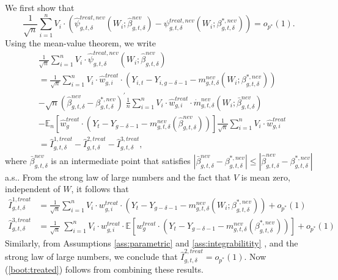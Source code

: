 \documentclass[11pt]{article}%
\theoremstyle{plain}
\numberwithin{sassumption}{section}
\numberwithin{equation}{section}
\begin{document}
{\small We first show that
\begin{equation}
\frac{1}{\sqrt{n}}\sum_{i=1}^{n}V_{i}\cdot\left(  \widehat{\psi}_{g,t,\delta
}^{treat,nev}(W_{i};\widehat{\beta}_{g,t,\delta}^{nev})-\psi_{g,t,\delta
}^{treat,nev}(W_{i};\beta_{g,t,\delta}^{\ast,nev})\right)  =o_{p^{\ast}%
}\left(  1\right)  . \label{boot:treated}%
\end{equation}
Using the mean-value theorem, we write%
\begin{align*}
&  \frac{1}{\sqrt{n}}\sum_{i=1}^{n}V_{i}\cdot\widehat{\psi}_{g,t,\delta
}^{treat,nev}(W_{i};\widehat{\beta}_{g,t,\delta}^{nev})\\
&  =\frac{1}{\sqrt{n}}\sum_{i=1}^{n}V_{i}\cdot\widehat{w}_{g,i}^{treat}%
\cdot\left(  Y_{i,t}-Y_{i,g-\delta-1}-m_{g,t,\delta}^{nev}\left(  W_{i}%
;\beta_{g,t,\delta}^{\ast,nev}\right)  \right) \\
&  -\sqrt{n}\left(  \widehat{\beta}_{g,t,\delta}^{nev}-\beta_{g,t,\delta
}^{\ast,nev}\right)  ^{\prime}\frac{1}{n}\sum_{i=1}^{n}V_{i}\cdot
\widehat{w}_{g,i}^{treat}\cdot\dot{m}_{g,t,\delta}^{nev}\left(  W_{i}%
;\bar{\beta}_{g,t,\delta}^{nev}\right) \\
&  -\mathbb{E}_{n}\left[  \widehat{w}_{g}^{treat}\cdot\left(  Y_{t}%
-Y_{g-\delta-1}-m_{g,t,\delta}^{nev}\left(  \widehat{\beta}_{g,t,\delta}%
^{nev}\right)  \right)  \right]  \frac{1}{\sqrt{n}}\sum_{i=1}^{n}V_{i}%
\cdot\widehat{w}_{g,i}^{treat}\\
&  =\widehat{I}_{g,t,\delta}^{1,treat}-\widehat{I}_{g,t,\delta}^{2,treat}%
-\widehat{I}_{g,t,\delta}^{3,treat},
\end{align*}
where $\bar{\beta}_{g,t,\delta}^{nev}$ is an intermediate point that satisfies
$\left\vert \bar{\beta}_{g,t,\delta}^{nev}-\beta_{g,t,\delta}^{\ast
,nev}\right\vert \leq\left\vert \widehat{\beta}_{g,t,\delta}^{nev}%
-\beta_{g,t,\delta}^{\ast,nev}\right\vert $ a.s.. From the strong law of large
numbers and the fact that $V$ is mean zero, independent of $W$, it follows
that
\begin{align*}
\widehat{I}_{g,t,\delta}^{1,treat}  &  =\frac{1}{\sqrt{n}}\sum_{i=1}^{n}%
V_{i}\cdot w_{g,i}^{treat}\cdot\left(  Y_{t}-Y_{g-\delta-1}-m_{g,t,\delta
}^{nev}\left(  W_{i};\beta_{g,t,\delta}^{\ast,nev}\right)  \right)
+o_{p^{\ast}}\left(  1\right) \\
\widehat{I}_{g,t,\delta}^{3,treat}  &  =\frac{1}{\sqrt{n}}~\sum_{i=1}^{n}%
V_{i}\cdot w_{g,i}^{treat}\cdot\mathbb{E}\left[  w_{g}^{treat}\cdot\left(
Y_{t}-Y_{g-\delta-1}-m_{g,t,\delta}^{nev}\left(  \beta_{g,t,\delta}^{\ast
,nev}\right)  \right)  \right]  +o_{p^{\ast}}\left(  1\right)
\end{align*}
Similarly, from Assumptions \ref{ass:parametric} and \ref{ass:integrabilitity}%
, and the strong law of large numbers, we conclude that $\widehat{I}%
_{g,t,\delta}^{2,treat}=o_{p^{\ast}}\left(  1\right)  $. Now
(\ref{boot:treated}) follows from combining these results. }
\end{document}
